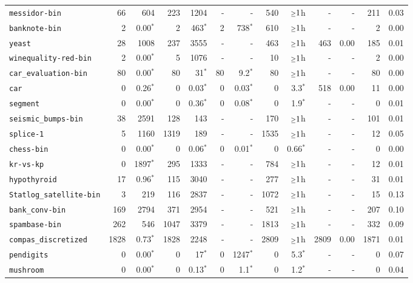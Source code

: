 \begin{tabular}{lrrrrrrrrrrrr}
\texttt{messidor-bin} & 66 & 604 & 223 & 1204 & - & - & 540 & $\mathsmaller{\geq}1$h & - & - & 211 & 0.03\\
\texttt{banknote-bin} & 2 & 0.00$^*$ & 2 & 463$^*$ & 2 & 738$^*$ & 610 & $\mathsmaller{\geq}1$h & - & - & 2 & 0.00\\
\texttt{yeast} & 28 & 1008 & 237 & 3555 & - & - & 463 & $\mathsmaller{\geq}1$h & 463 & 0.00 & 185 & 0.01\\
\texttt{winequality-red-bin} & 2 & 0.00$^*$ & 5 & 1076 & - & - & 10 & $\mathsmaller{\geq}1$h & - & - & 2 & 0.00\\
\texttt{car\_evaluation-bin} & 80 & 0.00$^*$ & 80 & 31$^*$ & 80 & 9.2$^*$ & 80 & $\mathsmaller{\geq}1$h & - & - & 80 & 0.00\\
\texttt{car} & 0 & 0.26$^*$ & 0 & 0.03$^*$ & 0 & 0.03$^*$ & 0 & 3.3$^*$ & 518 & 0.00 & 11 & 0.00\\
\texttt{segment} & 0 & 0.00$^*$ & 0 & 0.36$^*$ & 0 & 0.08$^*$ & 0 & 1.9$^*$ & - & - & 0 & 0.01\\
\texttt{seismic\_bumps-bin} & 38 & 2591 & 128 & 143 & - & - & 170 & $\mathsmaller{\geq}1$h & - & - & 101 & 0.01\\
\texttt{splice-1} & 5 & 1160 & 1319 & 189 & - & - & 1535 & $\mathsmaller{\geq}1$h & - & - & 12 & 0.05\\
\texttt{chess-bin} & 0 & 0.00$^*$ & 0 & 0.06$^*$ & 0 & 0.01$^*$ & 0 & 0.66$^*$ & - & - & 0 & 0.00\\
\texttt{kr-vs-kp} & 0 & 1897$^*$ & 295 & 1333 & - & - & 784 & $\mathsmaller{\geq}1$h & - & - & 12 & 0.01\\
\texttt{hypothyroid} & 17 & 0.96$^*$ & 115 & 3040 & - & - & 277 & $\mathsmaller{\geq}1$h & - & - & 31 & 0.01\\
\texttt{Statlog\_satellite-bin} & 3 & 219 & 116 & 2837 & - & - & 1072 & $\mathsmaller{\geq}1$h & - & - & 15 & 0.13\\
\texttt{bank\_conv-bin} & 169 & 2794 & 371 & 2954 & - & - & 521 & $\mathsmaller{\geq}1$h & - & - & 207 & 0.10\\
\texttt{spambase-bin} & 262 & 546 & 1047 & 3379 & - & - & 1813 & $\mathsmaller{\geq}1$h & - & - & 332 & 0.09\\
\texttt{compas\_discretized} & 1828 & 0.73$^*$ & 1828 & 2248 & - & - & 2809 & $\mathsmaller{\geq}1$h & 2809 & 0.00 & 1871 & 0.01\\
\texttt{pendigits} & 0 & 0.00$^*$ & 0 & 17$^*$ & 0 & 1247$^*$ & 0 & 5.3$^*$ & - & - & 0 & 0.07\\
\texttt{mushroom} & 0 & 0.00$^*$ & 0 & 0.13$^*$ & 0 & 1.1$^*$ & 0 & 1.2$^*$ & - & - & 0 & 0.04\\

\end{tabular}
